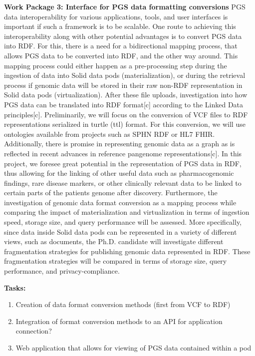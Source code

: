 \documentclass{article}
\begin{document}
\textbf{Work Package 3:  Interface for PGS data formatting conversions}
PGS data interoperability for various applications, tools, and user interfaces is important if such a framework is to be scalable. One route to achieving this interoperability along with other potential advantages is to convert PGS data into RDF. For this, there is a need for a bidirectional mapping process, that allows PGS data to be converted into RDF, and the other way around. This mapping process could either happen as a pre-processing step during the ingestion of data into Solid data pods (materialization), or during the retrieval process if genomic data will be stored in their raw non-RDF representation in Solid data pods (virtualization).
After these file uploads, investigation into how PGS data can be translated into RDF format[c] according to the Linked Data principles[c]. Preliminarily, we will focus on the conversion of VCF files to RDF representations serialized in turtle (ttl) format. For this conversion, we will use ontologies available from projects such as SPHN RDF or HL7 FHIR. Additionally, there is promise in representing genomic data as a graph as is reflected in recent advances in reference pangenome representations[c]. In this project, we foresee great potential in the representation of PGS data in RDF, thus allowing for the linking of other useful data such as pharmacogenomic findings, rare disease markers, or other clinically relevant data to be linked to certain parts of the patient\textquotesingle s genome after discovery. 
Furthermore, the investigation of genomic data format conversion as a mapping process while comparing the impact of materialization and virtualization in terms of ingestion speed, storage size, and query performance will be assessed. More specifically, since data inside Solid data pods can be represented in a variety of different views, such as documents, the Ph.D. candidate will investigate different fragmentation strategies for publishing genomic data represented in RDF. These fragmentation strategies will be compared in terms of storage size, query performance, and privacy-compliance.

\textbf{Tasks:} 
\begin{enumerate}
	\item Creation of data format conversion methods (first from VCF to RDF)
	\item Integration of format conversion methods to an API for application connection?
	\item Web application that allows for viewing of PGS data contained within a pod
\end{enumerate}
\end{document}
